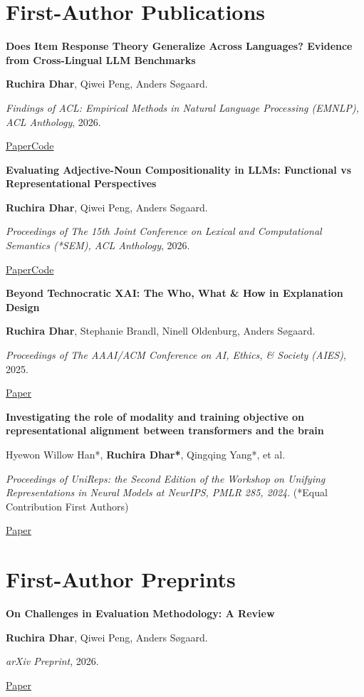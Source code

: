 \documentclass[11pt,letterpaper]{article}
\newcommand{\publication}[4]{%
  \par\addvspace{7pt}\Needspace{6\baselineskip}%
  \begin{samepage}%
    \setlength{\parskip}{1.5pt}%
    \noindent\textbf{#1}\par\nobreak
    {\small #2\par}\nobreak
    {\small\color{muted}#3\par}\nobreak
    {\footnotesize\sffamily #4\par}%
  \end{samepage}%
}
\begin{document}
\clearpage

\section{First-Author Publications}

\publication
  {Does Item Response Theory Generalize Across Languages? Evidence from Cross-Lingual LLM Benchmarks}
  {\textbf{Ruchira Dhar}, Qiwei Peng, Anders S\o{}gaard.}
  {\textit{ Findings of ACL: Empirical Methods in Natural Language Processing (EMNLP), ACL Anthology}, 2026.}
  {\href{https://aclanthology.org/2026.findings-emnlp.1889/}{Paper}\quad \href{https://github.com/ruchiradhar/benchfilter}{Code}}

\publication
  {Evaluating Adjective-Noun Compositionality in LLMs: Functional vs Representational Perspectives}
  {\textbf{Ruchira Dhar}, Qiwei Peng, Anders S\o{}gaard.}
  {\textit{Proceedings of The 15th Joint Conference on Lexical and Computational Semantics (*SEM), ACL Anthology}, 2026.}
  {\href{https://arxiv.org/abs/2603.09994}{Paper}\quad \href{https://github.com/ruchiradhar/compgenie}{Code}}

\publication
  {Beyond Technocratic XAI: The Who, What \& How in Explanation Design}
  {\textbf{Ruchira Dhar}, Stephanie Brandl, Ninell Oldenburg, Anders S\o{}gaard.}
  {\textit{Proceedings of The AAAI/ACM Conference on AI, Ethics, \& Society (AIES)}, 2025.}
  {\href{https://ojs.aaai.org/index.php/AIES/article/view/36586}{Paper}}

\publication
  {Investigating the role of modality and training objective on representational alignment between transformers and the brain}
  {Hyewon Willow Han*, \textbf{Ruchira Dhar*}, Qingqing Yang*, et al.}
  {\textit{Proceedings of UniReps: the Second Edition of the Workshop on Unifying Representations in Neural Models at NeurIPS, PMLR 285, 2024}. (*Equal Contribution First Authors)}
  {\href{https://proceedings.mlr.press/v285/han24a.html}{Paper}}


\section{First-Author Preprints}

\publication
  {On Challenges in Evaluation Methodology: A Review}
  {\textbf{Ruchira Dhar}, Qiwei Peng, Anders S\o{}gaard.}
  {\textit{arXiv Preprint}, 2026.}
  {\href{https://arxiv.org/abs/2604.25923}{Paper}}
\end{document}
